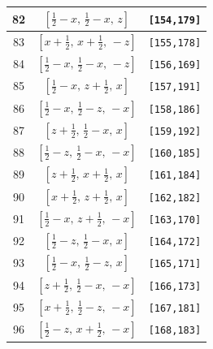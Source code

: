 \documentclass[fleqn,8pt]{jsarticle}
\begin{document}
\begin{longtable}{ccc}
82 & $\left[ \frac{1}{2} - x,\, \frac{1}{2} - x,\, z \right]$ & {\tt [154,179]} \\ \hline
83 & $\left[ x + \frac{1}{2},\, x + \frac{1}{2},\, - z \right]$ & {\tt [155,178]} \\ \hline
84 & $\left[ \frac{1}{2} - x,\, \frac{1}{2} - x,\, - z \right]$ & {\tt [156,169]} \\ \hline
85 & $\left[ \frac{1}{2} - x,\, z + \frac{1}{2},\, x \right]$ & {\tt [157,191]} \\ \hline
86 & $\left[ \frac{1}{2} - x,\, \frac{1}{2} - z,\, - x \right]$ & {\tt [158,186]} \\ \hline
87 & $\left[ z + \frac{1}{2},\, \frac{1}{2} - x,\, x \right]$ & {\tt [159,192]} \\ \hline
88 & $\left[ \frac{1}{2} - z,\, \frac{1}{2} - x,\, - x \right]$ & {\tt [160,185]} \\ \hline
89 & $\left[ z + \frac{1}{2},\, x + \frac{1}{2},\, x \right]$ & {\tt [161,184]} \\ \hline
90 & $\left[ x + \frac{1}{2},\, z + \frac{1}{2},\, x \right]$ & {\tt [162,182]} \\ \hline
91 & $\left[ \frac{1}{2} - x,\, z + \frac{1}{2},\, - x \right]$ & {\tt [163,170]} \\ \hline
92 & $\left[ \frac{1}{2} - z,\, \frac{1}{2} - x,\, x \right]$ & {\tt [164,172]} \\ \hline
93 & $\left[ \frac{1}{2} - x,\, \frac{1}{2} - z,\, x \right]$ & {\tt [165,171]} \\ \hline
94 & $\left[ z + \frac{1}{2},\, \frac{1}{2} - x,\, - x \right]$ & {\tt [166,173]} \\ \hline
95 & $\left[ x + \frac{1}{2},\, \frac{1}{2} - z,\, - x \right]$ & {\tt [167,181]} \\ \hline
96 & $\left[ \frac{1}{2} - z,\, x + \frac{1}{2},\, - x \right]$ & {\tt [168,183]} \\
\end{longtable}
\renewcommand{\arraystretch}{1.2}
\end{document}
